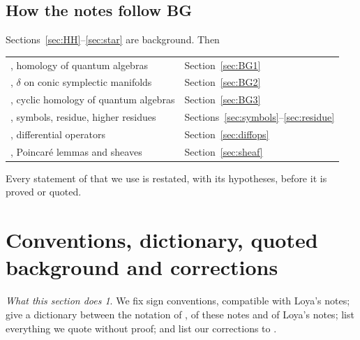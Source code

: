 \documentclass[11pt,oneside,reqno]{article}
\theoremstyle{plain}
\theoremstyle{definition}
\theoremstyle{remark}
\newtheorem*{whatdoes}{What this section does}
\begin{document}
\subsection{How the notes follow BG}\label{subsec:follow}
Sections~\ref{sec:HH}--\ref{sec:star} are background. Then
\begin{center}
\begin{tabular}{ll}
\cite[\S1]{BG}, homology of quantum algebras & Section~\ref{sec:BG1}\\
\cite[\S2]{BG}, \(\delta\) on conic symplectic manifolds & Section~\ref{sec:BG2}\\
\cite[\S3]{BG}, cyclic homology of quantum algebras & Section~\ref{sec:BG3}\\
\cite[\S4]{BG}, symbols, residue, higher residues & Sections~\ref{sec:symbols}--\ref{sec:residue}\\
\cite[\S\S4--5]{BG}, differential operators & Section~\ref{sec:diffops}\\
\cite[\S5]{BG}, Poincaré lemmas and sheaves & Section~\ref{sec:sheaf}
\end{tabular}
\end{center}
Every statement of \cite{BG} that we use is restated, with its
hypotheses, before it is proved or quoted.

\section{Conventions, dictionary, quoted background and corrections}
\label{sec:conventions}

\begin{whatdoes}
We fix sign conventions, compatible with Loya's notes; give a dictionary
between the notation of \cite{BG}, of these notes and of Loya's notes; list
everything we quote without proof; and list our corrections to \cite{BG}.
\end{whatdoes}
\end{document}
